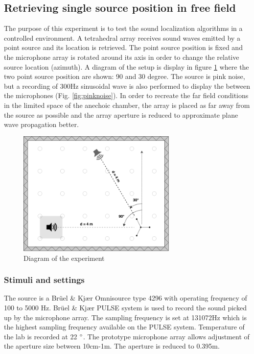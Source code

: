 \subsection{Retrieving single source position in free field}

The purpose of this experiment is to test the sound localization algorithms in a controlled environment. A tetrahedral array receives sound waves emitted by a point source and its location is  retrieved. The point source position is fixed and the microphone array is rotated around its axis in order to change the relative source location (azimuth). A diagram of the setup is display in figure \ref{fig:Anechoic1} where the two point source position are shown: 90 and 30 degree.  The source is pink noise, but a recording of 300Hz sinusoidal wave is also performed to display the between the microphones (Fig. \ref{fig:pinknoise}). In order to recreate the far field conditions in the limited space of the anechoic chamber, the array is placed as far away from the source as possible and the array aperture is reduced to approximate plane wave propagation better. 

\begin{figure}[H]
    \centering
    \includegraphics[width=0.7\textwidth]{Figures/Anechoicexp1.png}
    \caption{Diagram of the experiment}
    \label{fig:Anechoic1}
\end{figure}
 

\subsubsection{Stimuli and settings}

The source is a Brüel \& Kjær Omnisource type 4296 with operating frequency of 100 to 5000 Hz. Brüel \& Kjær PULSE system is used to record the sound picked up by the microphone array. The sampling frequency is set at 131072Hz which is the highest sampling frequency available on the PULSE system. Temperature of the lab is recorded at 22 $\degree$. The prototype microphone array allows adjustment of the aperture size between 10cm-1m. The aperture is reduced to 0.395m.

